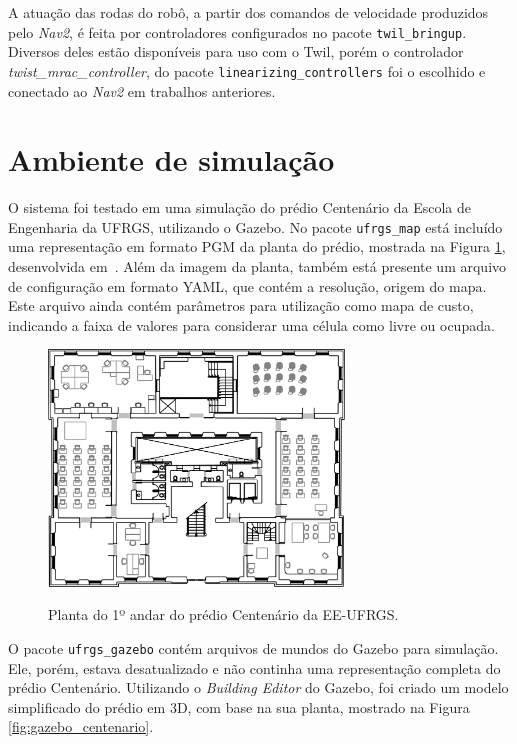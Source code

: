 \documentclass[repeatfields,xlists,xpacks,oneside,yearsonly]{ufrgscca}
\begin{document}
A atuação das rodas do robô, a partir dos comandos de velocidade
produzidos pelo \textit{Nav2}, é feita por controladores configurados
no pacote \texttt{twil\_bringup}. Diversos deles estão disponíveis
para uso com o Twil, porém o controlador
\textit{twist\_mrac\_controller}, do pacote
\texttt{linearizing\_controllers} foi o escolhido e conectado ao
\textit{Nav2} em trabalhos anteriores.

\section{Ambiente de simulação}

O sistema foi testado em uma simulação do prédio Centenário da Escola
de Engenharia da UFRGS, utilizando o Gazebo. No pacote
\texttt{ufrgs\_map} está incluído uma representação em formato PGM da
planta do prédio, mostrada na Figura \ref{fig:planta_centenario},
desenvolvida em~\textcite{petry_tcc}. Além da imagem da planta,
também está presente um arquivo de configuração em formato YAML, que
contém a resolução, origem do mapa. Este arquivo ainda contém
parâmetros para utilização como mapa de custo, indicando a faixa de
valores para considerar uma célula como livre ou ocupada.

\begin{figure}[H]
    {
        \centering
        \caption{Planta do 1º andar do prédio Centenário da EE-UFRGS.}
        \label{fig:planta_centenario}
        \includegraphics[width=0.7\textwidth]{centenario_floor_plan.png}\\
    }
    {}
\end{figure}

O pacote \texttt{ufrgs\_gazebo} contém arquivos de mundos do Gazebo
para simulação. Ele, porém, estava desatualizado e não continha uma
representação completa do prédio Centenário. Utilizando o
\textit{Building Editor} do Gazebo, foi criado um modelo simplificado
do prédio em 3D, com base na sua planta, mostrado na Figura
\ref{fig:gazebo_centenario}.
\end{document}
